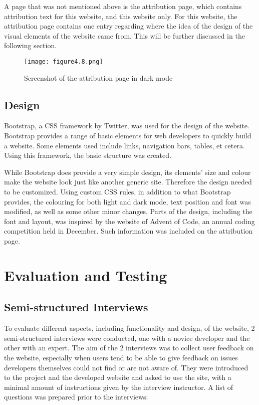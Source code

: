 \documentclass{report}
\begin{document}
A page that was not mentioned above is the attribution page, which contains attribution text for this website, and this website only. For this website, the attribution page contains one entry regarding where the idea of the design of the visual elements of the website came from. This will be further discussed in the following section.

\begin{figure}[h!]
\centering
\texttt{[image: figure4.8.png]}
\caption{Screenshot of the attribution page in dark mode}
\end{figure}

\subsection{Design}

Bootstrap, a CSS framework by Twitter, was used for the design of the website. Bootstrap provides a range of basic elements for web developers to quickly build a website. Some elements used include links, navigation bars, tables, et cetera. Using this framework, the basic structure was created.

While Bootstrap does provide a very simple design, its elements’ size and colour make the website look just like another generic site. Therefore the design needed to be customized. Using custom CSS rules, in addition to what Bootstrap provides, the colouring for both light and dark mode, text position and font was modified, as well as some other minor changes. Parts of the design, including the font and layout, was inspired by the website of Advent of Code, an annual coding competition held in December. Such information was included on the attribution page.

\section{Evaluation and Testing}

\subsection{Semi-structured Interviews}

To evaluate different aspects, including functionality and design, of the website, 2 semi-structured interviews were conducted, one with a novice developer and the other with an expert. The aim of the 2 interviews was to collect user feedback on the website, especially when users tend to be able to give feedback on issues developers themselves could not find or are not aware of. They were introduced to the project and the developed website and asked to use the site, with a minimal amount of instructions given by the interview instructor. A list of questions was prepared prior to the interviews:
\end{document}
